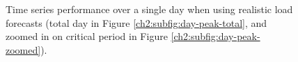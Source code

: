 \begin{figure}[htb]\centering
	\vspace{0mm}
	\caption{Time series performance over a single day when using realistic load forecasts (total day in Figure \ref{ch2:subfig:day-peak-total}, and zoomed in on critical period in Figure \ref{ch2:subfig:day-peak-zoomed}).}
	\label{ch2:fig:day-peak}
\end{figure}